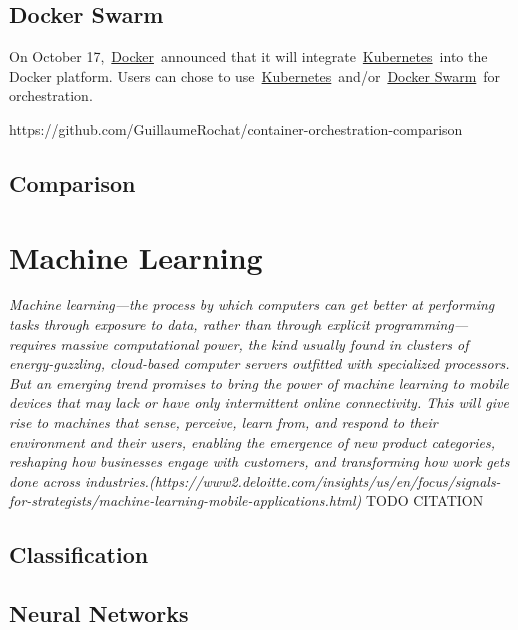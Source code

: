 \subsection{Docker Swarm}\label{docker-swarm}

On October 17,~\href{https://www.docker.com/}{Docker}~announced that it
will integrate~\href{https://kubernetes.io/}{Kubernetes}~into the Docker
platform. Users can chose to
use~\href{https://www.docker.com/kubernetes}{Kubernetes}~and/or~\href{https://docs.docker.com/engine/swarm/}{Docker
Swarm}~for orchestration.~

https://github.com/GuillaumeRochat/container-orchestration-comparison

\subsection{Comparison}\label{comparison}

\section{Machine Learning}\label{machine-learning}

\emph{Machine learning---the process by which computers can get better
at performing tasks through exposure to data, rather than through
explicit programming---requires massive computational power, the kind
usually found in clusters of energy-guzzling, cloud-based computer
servers outfitted with specialized processors. But an emerging trend
promises to bring the power of machine learning to mobile devices that
may lack or have only intermittent online connectivity. This will give
rise to machines that sense, perceive, learn from, and respond to their
environment and their users, enabling the emergence of new product
categories, reshaping how businesses engage with customers, and
transforming how work gets done across
industries.(https://www2.deloitte.com/insights/us/en/focus/signals-for-strategists/machine-learning-mobile-applications.html)}
TODO CITATION

\subsection{Classification}\label{classification}

\subsection{Neural Networks}\label{neural-networks}

